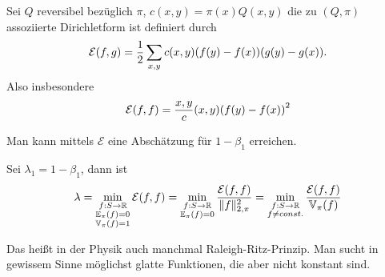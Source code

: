 \begin{definition}
	Sei $Q$ reversibel bezüglich $\pi$, $c(x,y) = \pi(x) Q(x,y)$ die zu $(Q,\pi)$ assoziierte Dirichletform ist definiert durch
	\begin{align}
		\mathcal{E}(f,g) = \frac{1}{2}\sum\limits_{x,y}c(x,y)\enb{f(y) - f(x)}\enb{g(y)- g(x)}.
	\end{align}
	Also insbesondere
	\begin{align}
		\mathcal{E}(f,f) = \frac{x,y} c(x,y) \enb{f(y)-f(x)}^2
	\end{align}
\end{definition}

Man kann mittels $\mathcal{E}$ eine Abschätzung für $1-\beta_1$	erreichen.
\begin{satz}
	\label{satz:11-20}
	Sei $\lambda_1 = 1-\beta_1$, dann ist  
	\begin{align}
		\lambda = \min\limits_{\substack{f:S\to \RR \\ \EW{\relax}_{\pi}(f) = 0 \\ \Var{\relax}_{\pi}(f) = 1}} \mathcal{E}(f,f) = \min\limits_{\substack{f:S\to \RR \\ \EW{\relax}_{\pi} (f) = 0}} \frac{\mathcal{E}(f,f)}{\Norm{f}^2_{2,\pi}} = \min\limits_{\substack{f:S \to \RR \\ f \neq const.}} \frac{\mathcal{E}(f,f)}{\Var{\relax}_{\pi}(f)}
	\end{align}
\end{satz}
\begin{bemerkung}
	Das heißt in der Physik auch manchmal Raleigh-Ritz-Prinzip. Man sucht in gewissem Sinne möglichst glatte Funktionen, die aber nicht konstant sind.
\end{bemerkung}
